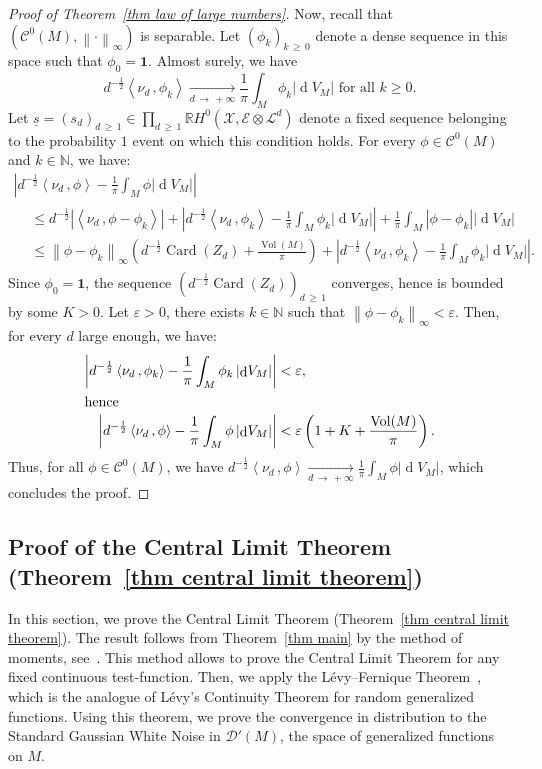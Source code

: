 \documentclass[AHL,Unicode,longabstracts,published]{cedram}
\DeclareMathOperator{\card}{Card}
\DeclareMathOperator{\dmesure}{d}
\DeclareMathOperator{\Vol}{Vol}
\newcommand{\D}{\mathcal{D}}
\newcommand{\E}{\mathcal{E}}
\newcommand{\X}{\mathcal{X}}
\renewcommand{\L}{\mathcal{L}}
\newcommand{\clC}{\mathcal{C}}
\newcommand{\N}{\mathbb{N}}
\newcommand{\R}{\mathbb{R}}
\newcommand{\bfun}{\mathbf{1}}
\newcommand{\norm}[1]{\left\lvert #1 \right\rvert}
\newcommand{\Norm}[1]{\left\lVert #1 \right\rVert}
\newcommand{\prsc}[2]{\left\langle #1\,, #2 \right\rangle}
\newcommand{\rmes}[1]{\norm{\dmesure\! V_{#1}}}
\newcommand{\vol}[1]{\Vol\!\left(#1\right)}
\renewcommand{\H}{H^0(\X,\E \otimes \L^d)}
\renewcommand{\epsilon}{\varepsilon}
\renewcommand{\geq}{\geqslant}
\renewcommand{\leq}{\leqslant}
\begin{document}
\begin{proof}[Proof of Theorem~\ref{thm law of large numbers}]
Now, recall that $(\clC^0(M),\Norm{\cdot}_\infty)$ is separable. Let $(\phi_k)_{k\,\geq\,0}$ denote a dense sequence in this space such that $\phi_0 =\bfun$. Almost surely, we have \[
d^{-\frac{1}{2}} \prsc{\nu_d}{\phi_k} \xrightarrow[d\,\to\,+\infty]{} \frac{1}{\pi} \int_M \phi_k \rmes{M}\text{ for all }k \geq 0.
\]
Let $\underline{s}=(s_d)_{d\,\geq\,1} \in \prod_{d\,\geq\,1} \R\H$ denote a fixed sequence belonging to the probability $1$ event on which this condition holds. For every $\phi \in \clC^0(M)$ and $k \in \N$, we have:
\begin{multline*}
\norm{d^{-\frac{1}{2}}\prsc{\nu_d}{\phi} - \frac{1}{\pi} \int_M \phi \rmes{M}}\\
\begin{aligned}
&\leq d^{-\frac{1}{2}}\norm{\prsc{\nu_d}{\phi-\phi_k}} + \norm{d^{-\frac{1}{2}}\prsc{\nu_d}{\phi_k} - \frac{1}{\pi} \int_M \phi_k \rmes{M}} + \frac{1}{\pi} \int_M \norm{\phi-\phi_k} \rmes{M}\\
&\leq \Norm{\phi-\phi_k}_\infty \left(d^{-\frac{1}{2}}\card(Z_d) + \frac{\vol{M}}{\pi}\right) + \norm{d^{-\frac{1}{2}}\prsc{\nu_d}{\phi_k} - \frac{1}{\pi} \int_M \phi_k \rmes{M}}.
\end{aligned}
\end{multline*}
Since $\phi_0=\bfun$, the sequence $(d^{-\frac{1}{2}}\card(Z_d))_{d\,\geq\,1}$ converges, hence is bounded by some $K >0$. Let $\epsilon >0$, there exists $k \in \N$ such that $\Norm{\phi-\phi_k}_\infty < \epsilon$. Then, for every $d$ large enough, we have:
\begin{align*}
\norm{d^{-\frac{1}{2}}\prsc{\nu_d}{\phi_k} - \frac{1}{\pi} \int_M \phi_k \rmes{M}} &< \epsilon,
\\
\intertext{hence}
\norm{d^{-\frac{1}{2}}\prsc{\nu_d}{\phi} - \frac{1}{\pi} \int_M \phi \rmes{M}} &< \epsilon \left(1 + K +\frac{\vol{M}}{\pi}\right).
\end{align*}
Thus, for all $\phi \in \clC^0(M)$, we have $d^{-\frac{1}{2}}\prsc{\nu_d}{\phi} \xrightarrow[d\,\to\,+\infty]{} \frac{1}{\pi} \int_M \phi \rmes{M}$, which concludes the proof.
\end{proof}



\subsection{Proof of the Central Limit Theorem (Theorem~\ref{thm central limit theorem})}\label{subsec proof of the CLT}

In this section, we prove the Central Limit Theorem (Theorem~\ref{thm central limit theorem}). The result follows from Theorem~\ref{thm main} by the method of moments, see~\cite[Chapter~30]{Bil1995}. This method allows to prove the Central Limit Theorem for any fixed continuous test-function. Then, we apply the Lévy--Fernique Theorem~\cite[Theorem~III.6.5]{Fer1967}, which is the analogue of Lévy's Continuity Theorem for random generalized functions. Using this theorem, we prove the convergence in distribution to the Standard Gaussian White Noise in $\D'(M)$, the space of generalized functions on $M$.
\vspace{6pt}
\end{document}

